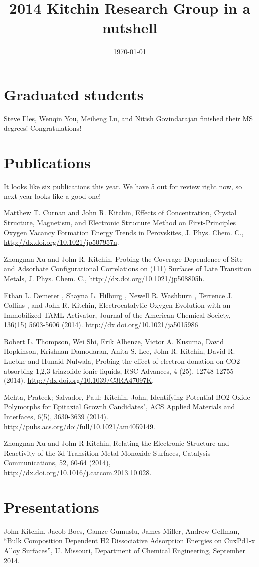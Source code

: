 \documentclass[aps,prb,citeautoscript,preprint,citeautoscript,showkeys]{revtex4-1}
\date{\today}
\title{2014 Kitchin Research Group in a nutshell}
\begin{document}
\section{Graduated students}
\label{sec-1}
Steve Illes, Wenqin You, Meiheng Lu, and Nitish Govindarajan finished their MS degrees! Congratulations!

\section{Publications}
\label{sec-2}
It looks like six publications this year. We have 5 out for review right now, so next year looks like a good one!

Matthew T. Curnan and John R. Kitchin, Effects of Concentration, Crystal Structure, Magnetism, and Electronic Structure Method on First-Principles Oxygen Vacancy Formation Energy Trends in Perovskites, J. Phys. Chem. C., \url{http://dx.doi.org/10.1021/jp507957n}. 

Zhongnan Xu and John R. Kitchin, Probing the Coverage Dependence of Site and Adsorbate Configurational Correlations on (111) Surfaces of Late Transition Metals, J. Phys. Chem. C., \url{http://dx.doi.org/10.1021/jp508805h}. 

Ethan L. Demeter , Shayna L. Hilburg , Newell R. Washburn , Terrence J. Collins , and John R. Kitchin, Electrocatalytic Oxygen Evolution with an Immobilized TAML Activator,  Journal of the American Chemical Society, 136(15) 5603-5606 (2014). \url{http://dx.doi.org/10.1021/ja5015986}

Robert L. Thompson, Wei Shi, Erik Albenze, Victor A. Kusuma, David Hopkinson, Krishnan Damodaran,  Anita S. Lee, John R. Kitchin, David R. Luebke and Hunaid Nulwala, Probing the effect of electron donation on CO2 absorbing 1,2,3-triazolide ionic liquids, RSC Advances, 4 (25), 12748-12755 (2014). \url{http://dx.doi.org/10.1039/C3RA47097K}. 

Mehta, Prateek; Salvador, Paul; Kitchin, John, Identifying Potential BO2 Oxide Polymorphs for Epitaxial Growth Candidates", ACS Applied Materials and Interfaces, 6(5), 3630-3639 (2014). \url{http://pubs.acs.org/doi/full/10.1021/am4059149}. 

Zhongnan Xu and John R Kitchin, Relating the Electronic Structure and Reactivity of the 3d Transition Metal Monoxide Surfaces, Catalysis Communications, 52, 60-64 (2014),        \url{http://dx.doi.org/10.1016/j.catcom.2013.10.028}. 

\section{Presentations}
\label{sec-3}
John Kitchin, Jacob Boes, Gamze Gumuslu, James Miller, Andrew Gellman, “Bulk Composition Dependent H2 Dissociative Adsorption Energies on CuxPd1-x Alloy Surfaces”, U. Missouri, Department of Chemical Engineering, September 2014.
\end{document}

